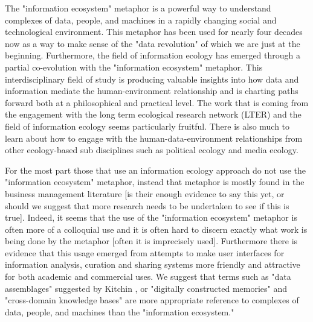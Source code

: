 The "information ecosystem" metaphor is a powerful way to understand complexes of data, people, and machines in a rapidly changing social and technological environment. This metaphor has been used for nearly four decades now as a way to make sense of the "data revolution" of which we are just at the beginning. Furthermore, the field of information ecology has emerged through a partial co-evolution with the "information ecosystem" metaphor. This interdisciplinary field of study is producing valuable insights into how data and information mediate the human-environment relationship and is charting paths forward both at a philosophical and practical level. The work that is coming from the engagement with the long term ecological research network (LTER) and the field of information ecology seems particularly fruitful. There is also much to learn about how to engage with the human-data-environment relationships from other ecology-based sub disciplines such as political ecology and media ecology. 

For the most part those that use an information ecology approach do not use the "information ecosystem" metaphor, instead that metaphor is mostly found in the business management literature [is their enough evidence to say this yet, or should we suggest that more research needs to be undertaken to see if this is true]. Indeed, it seems that the use of the "information ecosystem" metaphor is often more of a colloquial use and it is often hard to discern exactly what work is being done by the metaphor [often it is imprecisely used]. Furthermore there is evidence that this usage emerged from attempts to make user interfaces for information analysis, curation and sharing systems more friendly and attractive for both academic and commercial uses. We suggest that terms such as "data assemblages" suggested by Kitchin \citep{kitchin_2014}, or "digitally constructed memories" and "cross-domain knowledge bases" \citep{baker_2007} are more appropriate reference to complexes of data, people, and machines than the "information ecosystem." 

